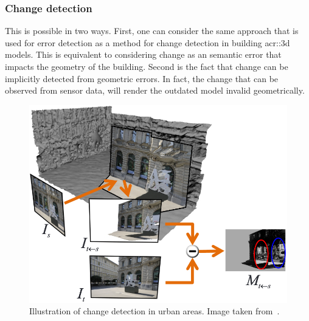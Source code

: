         \subsubsection{Change detection}
            This is possible in two ways.
            First, one can consider the same approach that is used for error detection as a method for change detection in building \gls{acr::3d} models.
            This is equivalent to considering change as an semantic error that impacts the geometry of the building.
            Second is the fact that change can be implicitly detected from geometric errors.
            In fact, the change that can be observed from sensor data, will render the outdated model invalid geometrically.
            \begin{figure}[htpb]
                \centering
                \includegraphics[width=.7\textwidth]{images/introduction/use/change_detection_taneja}
                \caption[
                    Illustration of change detection in urban areas.
                ]{
                    \label{fig::3d_change_detection}
                    Illustration of change detection in urban areas.
                    Image taken from~\parencite{taneja2013city}.
                }
            \end{figure}

